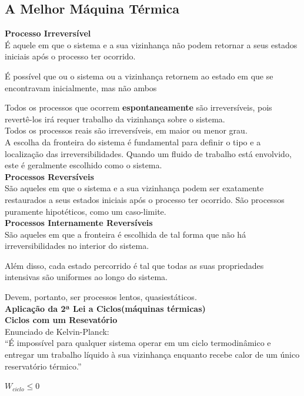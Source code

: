 \documentclass[a4paper, 12pt]{article}
\begin{document}
\subsection{A Melhor Máquina Térmica}
\textbf{Processo Irreversível}\\
É aquele em que o sistema e a sua vizinhança não podem retornar a seus estados
iniciais após o processo ter ocorrido.

É possível que ou o sistema ou a vizinhança retornem ao estado em que
se encontravam inicialmente, mas não ambos

Todos os processos que ocorrem \textbf{espontaneamente} são irreversíveis, pois
revertê-los irá requer trabalho da vizinhança sobre o sistema.\\

Todos os processos reais são irreversíveis, em maior ou menor grau.\\

A escolha da fronteira do sistema é fundamental para definir o tipo e a
localização das irreversibilidades. Quando um fluido de trabalho está
envolvido, este é geralmente escolhido como o sistema.\\

\textbf{Processos Reversíveis}\\
São aqueles em que o sistema e a sua vizinhança podem ser
exatamente restaurados a seus estados iniciais após o processo ter
ocorrido.
São processos puramente hipotéticos, como um caso-limite.\\

\textbf{Processos Internamente Reversíveis}\\
São aqueles em que a fronteira é escolhida de tal forma que não há irreversibilidades
no interior do sistema.

Além disso, cada estado percorrido é tal que todas as suas propriedades intensivas são
uniformes ao longo do sistema.

Devem, portanto, ser processos lentos, quasiestáticos.\\

\textbf{Aplicação da 2ª Lei a Ciclos(máquinas térmicas)}\\

\textbf{Ciclos com um Resevatório}\\
Enunciado de Kelvin-Planck:\\
“É impossível para qualquer sistema operar em
um ciclo termodinâmico e entregar um
trabalho líquido à sua vizinhança enquanto
recebe calor de um único reservatório térmico.”
	\begin{center}
		\large
		$ W_{ciclo} \leq 0$
	\end{center}
\end{document}
